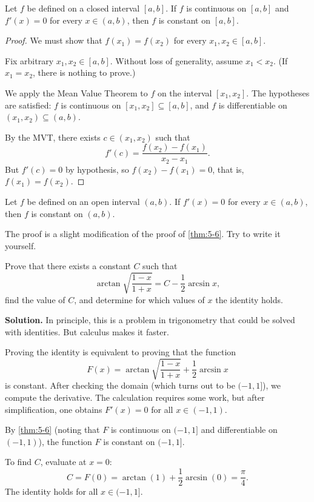 \begin{theorem}
\label{thm:5-6}
Let $f$ be defined on a closed interval $[a,b]$.  If $f$ is continuous on $[a,b]$ and $f'(x) = 0$ for every $x \in (a,b)$, then $f$ is constant on $[a,b]$.
\end{theorem}

\begin{proof}
We must show that $f(x_{1}) = f(x_{2})$ for every $x_{1}, x_{2} \in [a,b]$.

Fix arbitrary $x_{1}, x_{2} \in [a,b]$.  Without loss of generality, assume $x_{1} < x_{2}$.  (If $x_{1} = x_{2}$, there is nothing to prove.)


We apply the Mean Value Theorem to $f$ on the interval $[x_{1}, x_{2}]$.  The hypotheses are satisfied: $f$ is continuous on $[x_{1}, x_{2}] \subseteq [a,b]$, and $f$ is differentiable on $(x_{1}, x_{2}) \subseteq (a,b)$.

By the MVT, there exists $c \in (x_{1}, x_{2})$ such that
\[
  f'(c) = \frac{f(x_{2}) - f(x_{1})}{x_{2} - x_{1}}.
\]
But $f'(c) = 0$ by hypothesis, so $f(x_{2}) - f(x_{1}) = 0$, that is, $f(x_{1}) = f(x_{2})$.
\end{proof}

\begin{theorem}
\label{thm:5-7}
Let $f$ be defined on an open interval $(a,b)$.  If $f'(x) = 0$ for every $x \in (a,b)$, then $f$ is constant on $(a,b)$.
\end{theorem}

\begin{remark}
The proof is a slight modification of the proof of \cref{thm:5-6}.  Try to write it yourself.
\end{remark}

\begin{example}
\label{ex:5-3}
Prove that there exists a constant $C$ such that
\[
  \arctan\!\sqrt{\frac{1-x}{1+x}} = C - \frac{1}{2}\arcsin x,
\]
find the value of $C$, and determine for which values of $x$ the identity holds.

\textbf{Solution.}  In principle, this is a problem in trigonometry that could be solved with identities.  But calculus makes it faster.

Proving the identity is equivalent to proving that the function
\[
  F(x) = \arctan\!\sqrt{\frac{1-x}{1+x}} + \frac{1}{2}\arcsin x
\]
is constant.  After checking the domain (which turns out to be $(-1, 1]$), we compute the derivative.  The calculation requires some work, but after simplification, one obtains $F'(x) = 0$ for all $x \in (-1, 1)$.

By \cref{thm:5-6} (noting that $F$ is continuous on $(-1, 1]$ and differentiable on $(-1, 1)$), the function $F$ is constant on $(-1, 1]$.

To find $C$, evaluate at $x = 0$:
\[
  C = F(0) = \arctan(1) + \frac{1}{2}\arcsin(0) = \frac{\pi}{4}.
\]
The identity holds for all $x \in (-1, 1]$.
\end{example}

